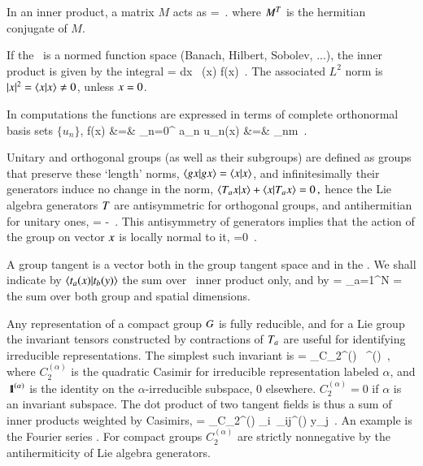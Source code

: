 In an inner product, a matrix $M$ acts as
\beq
{} =
\,.
where $\dual{M}$ is the hermitian conjugate of $M$.

If the \statesp\ is a normed function space (Banach, Hilbert, Sobolev, ...),
the inner product is given by the integral
\beq
{} = \int dx \, (x) f(x)
\,.
The associated $L^2$ norm is
$|\ssp|^2 = \braket{\ssp}{\ssp} \neq 0$, unless $\ssp = 0$.

In computations the functions are expressed in terms of
complete orthonormal basis sets $\{u_n\}$,
\bea
f(x) &=& \sum_{n=0}^{\infty} a_n u_n(x)
    \continue
{} &=& \delta_{nm}
\,.
\label{basisL2}
\eea

Unitary and orthogonal groups (as well as their subgroups) are defined as groups that preserve these `length' norms, $\braket{\LieEl x}{\LieEl x} =  \braket{x}{x}$, and infinitesimally their generators  induce no change in the norm,
\(
\braket{ \Lg_a\ssp}{\ssp}
  +\braket{\ssp}{\Lg_a\ssp} =0
\,,
\)
hence the Lie algebra generators $T$ are antisymmetric for orthogonal groups, and antihermitian for unitary ones,
\beq
\dual{\Lg} = - \Lg
\,.
This antisymmetry of generators
implies that the action of the group on vector $x$ is
locally normal to it,
\beq
{} =0
\,.

A group tangent  is a vector both in the group
tangent space and in the \statesp.
We shall indicate by $\braket{\groupTan_{a}(x)}{\groupTan_{b}(y)}$  the sum over \statesp\ inner product only, and by
\beq
{} =
    \sum_{a=1}^N  =
the sum over both group and spatial dimensions.

Any representation of a compact group $G$ is fully
reducible, and for a Lie group
the invariant tensors constructed by contractions
of $T_a$ are useful for identifying irreducible
representations. The simplest such invariant is
\beq
\dual{\Lg} \cdot \Lg = \sum_\alpha C_2^{(\alpha)} \, \id^{(\alpha)}
\,,
where $C_2^{(\alpha)}$ is the quadratic Casimir for
irreducible representation labeled $\alpha$, and
${\ \hbox{{\rm 1}\kern-.6em\hbox{\rm 1}}}^{(\alpha)}$ is the identity on the $\alpha$-irreducible
subspace, 0 elsewhere. $ C_2^{(\alpha)} =0$ if $\alpha$
is an invariant subspace.
The dot product of two tangent fields
 is thus a sum of inner products
weighted by Casimirs,
\beq
{}
   = \sum_\alpha C_2^{(\alpha)} _i\, \delta_{ij}^{(\alpha)} y_j
\,.
An example is the Fourier series .
For compact groups $C_2^{(\alpha)}$ are strictly nonnegative by
the antihermiticity  of Lie algebra generators.
